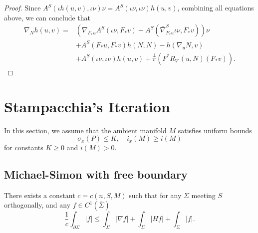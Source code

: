 \begin{proof}
    Since $A^S(\iota  h(u,v) , \iota \nu ) \nu =A^S(\iota  \nu  , \iota \nu )h(u,v)$, combining all equations above, we can conclude that 
    \begin{equation*}
        \begin{split}
            \nabla _N h(u,v)
            =& \left( \nabla _{F_*u}A^S(\iota \nu , F_*v)+A^S(\bar{\nabla }^{S}_{F_*u} \iota \nu , F_*v)  \right)   \nu \\
            & +A^S(F_*u, F_* v)h(N,N)-h(\nabla_u N, v) \\
            & + A^S(\iota  \nu  , \iota \nu )h(u,v) +\overset{\perp }{\pi} (F^*R_{\nabla }(u,N)(F_* v)).
    \end{split}
    \end{equation*} 
\end{proof}

\section{Stampacchia's Iteration}
In this section, we assume that the ambient manifold $M$ satisfies uniform bounds
\[\sigma _x(P) \leq K, \quad i_x(M) \geq i(M)\]
for constants $K \geq 0$ and $i(M)>0$.

\subsection{Michael-Simon with free boundary}

\begin{lemma}\label{BoundaryIntegral}
    There exists a constant $c=c(n,S,M)$ such that for any $\Sigma $ meeting $S$ orthogonally, and any $f \in C^1(\bar{\Sigma })$ 
    \[
        \frac{1}{c}\int_{\partial \Sigma } \left| f \right| \leq \int_{ \Sigma} \left| \nabla f \right| + \int_{ \Sigma} \left| Hf \right| + \int_{ \Sigma} \left| f \right| .   
    \]
\end{lemma}

